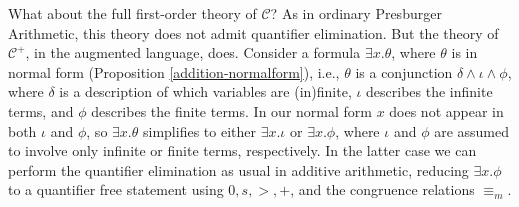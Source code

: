 \documentclass[12pt,oneside,reqno]{amsart}
\theoremstyle{definition}
\begin{document}





What about the full first-order theory of $\mathcal{C}$? As in ordinary Presburger Arithmetic, this theory does not admit quantifier elimination. But the theory of $\mathcal{C}^+$, in the augmented language, does. Consider a formula $\exists x.\theta$, where $\theta$ is in normal form (Proposition \ref{addition-normalform}), i.e., $\theta$ is a conjunction $\delta\wedge\iota\wedge\phi$, where $\delta$ is a description of which variables are (in)finite, $\iota$ describes the infinite terms, and $\phi$ describes the finite terms. In our normal form $x$ does not appear in both $\iota$ and $\phi$, so $\exists x. \theta$ simplifies to either $\exists x.\iota$ or $\exists x.\phi$, where $\iota$ and $\phi$ are assumed to involve only infinite or finite terms, respectively. In the latter case we can perform the quantifier elimination as usual in additive arithmetic, reducing $\exists x.\phi$ to a quantifier free statement using $0,s,>,+$, and the congruence relations $\equiv_m$.
\end{document}
